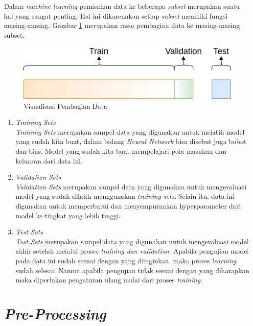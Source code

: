 Dalam \textit{machine learning} pemisahan data ke beberapa \textit{subset} merupakan suatu hal yang sangat penting. Hal ini dikarenakan setiap \textit{subset} memiliki fungsi masing-masing. Gambar \ref{fig:data-splitting} merupakan rasio pembagian data ke masing-masing subset.

\begin{figure}[ht]
	\centering
	\includegraphics[scale=0.5]{gambar/data-splitting.png}
	\caption{Visualisasi Pembagian Data}
	\label{fig:data-splitting}
\end{figure}

\begin{enumerate}
	\item \textit{Training Sets}\\
	\textit{Training Sets} merupakan sampel data yang digunakan untuk melatih model yang sudah kita buat, dalam bidang \textit{Neural Network} bisa disebut juga bobot dan bias. Model yang sudah kita buat mempelajari pola masukan dan keluaran dari data ini. 
	
	\item \textit{Validation Sets}\\
	\textit{Validation Sets} merupakan sampel data yang digunakan untuk mengevaluasi model yang sudah dilatih menggunakan \textit{training sets}. Selain itu, data ini digunakan untuk memperbarui dan menyempurnakan hyperparameter dari model ke tingkat yang lebih tinggi.
	
	\item\textit{Test Sets}\\
	\textit{Test Sets} merupakan sampel data yang digunakan untuk mengevaluasi model akhir setelah melalui proses \textit{training dan validation}. Apabila pengujian model pada data ini sudah sesuai dengan yang diinginkan, maka proses \textit{learning} sudah selesai. Namun apabila pengujian tidak sesuai dengan yang diharapkan maka diperlukan pengaturan ulang mulai dari proses \textit{training}. 
\end{enumerate}

\section{\textit{Pre-Processing}}
\label{sec:preprocessing}

